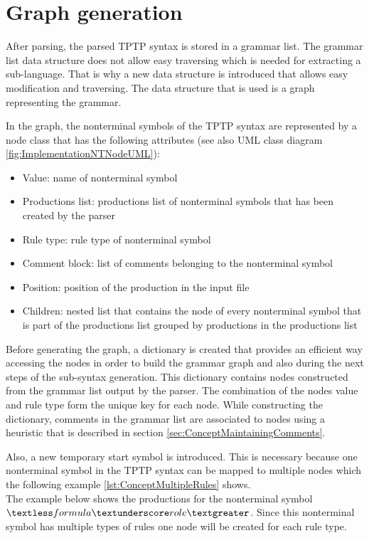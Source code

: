 \section{Graph generation}\label{sec:ConceptGraphGeneration}

After parsing, the parsed \ac{TPTP} syntax is stored in a grammar list. The grammar list data structure does not allow easy traversing which is needed for extracting a sub-language. That is why a new data structure is introduced that allows easy modification and traversing. The data structure that is used is a graph representing the
grammar.

In the graph, the nonterminal symbols of the \ac{TPTP} syntax are represented by a node class that has the following attributes (see also UML class diagram \ref{fig:ImplementationNTNodeUML}):
\begin{itemize}
\item Value: name of nonterminal symbol
\item Productions list: productions list of nonterminal symbols that has been created by the parser
\item Rule type: rule type of nonterminal symbol
\item Comment block: list of comments belonging to the nonterminal symbol
\item Position: position of the production in the input file
\item Children: nested list that contains the node of every nonterminal symbol that is part of the productions list grouped by productions in the productions list
\end{itemize}

Before generating the graph, a dictionary is created that provides an efficient way accessing the nodes in order to build the grammar graph and also during the next steps of the sub-syntax generation.
This dictionary contains nodes constructed from the grammar list output by the parser. The combination of the nodes value and rule type form the unique key for each node. While constructing the dictionary, comments in the grammar list are associated to nodes using a heuristic that is described in section \ref{sec:ConceptMaintainingComments}.

Also, a new temporary start symbol is introduced.
This is necessary because one nonterminal symbol in the \ac{TPTP} syntax can be mapped to multiple nodes which the following example \ref{lst:ConceptMultipleRules} shows. \\
The example below shows the productions for the nonterminal symbol \\
$\textless formula\textunderscore role\textgreater$.
Since this nonterminal symbol has multiple types of rules one node will be created for each rule type.


